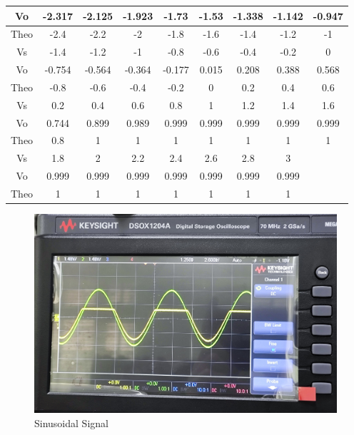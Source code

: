 \begin{itemize}
\begin{table}[h]
\begin{tabular}{|c|c|c|c|c|c|c|c|c|}
                Vo   & -2.317 & -2.125 & -1.923 & -1.73  & -1.53 & -1.338 & -1.142 & -0.947 \\ \hline
                Theo & -2.4   & -2.2   & -2     & -1.8   & -1.6  & -1.4   & -1.2   & -1     \\ \hline
                Vs   & -1.4   & -1.2   & -1     & -0.8   & -0.6  & -0.4   & -0.2   & 0      \\ \hline
                Vo   & -0.754 & -0.564 & -0.364 & -0.177 & 0.015 & 0.208  & 0.388  & 0.568  \\ \hline
                Theo & -0.8   & -0.6   & -0.4   & -0.2   & 0     & 0.2    & 0.4    & 0.6    \\ \hline
                Vs   & 0.2    & 0.4    & 0.6    & 0.8    & 1     & 1.2    & 1.4    & 1.6    \\ \hline
                Vo   & 0.744  & 0.899  & 0.989  & 0.999  & 0.999 & 0.999  & 0.999  & 0.999  \\ \hline
                Theo & 0.8    & 1      & 1      & 1      & 1     & 1      & 1      & 1      \\ \hline
                Vs   & 1.8    & 2      & 2.2    & 2.4    & 2.6   & 2.8    & 3      &        \\ \hline
                Vo   & 0.999  & 0.999  & 0.999  & 0.999  & 0.999 & 0.999  & 0.999  &        \\ \hline
                Theo & 1      & 1      & 1      & 1      & 1     & 1      & 1      &        \\ \hline
            \end{tabular}
            \end{table}
            \FloatBarrier
            \begin{figure}[h]
                \centering
                \includegraphics[width=0.65\linewidth]{Lab02/2.5_sin_clipper1.jpg}
                \caption{Sinusoidal Signal}
                \label{2.5sin}
            \end{figure}

\end{itemize}
